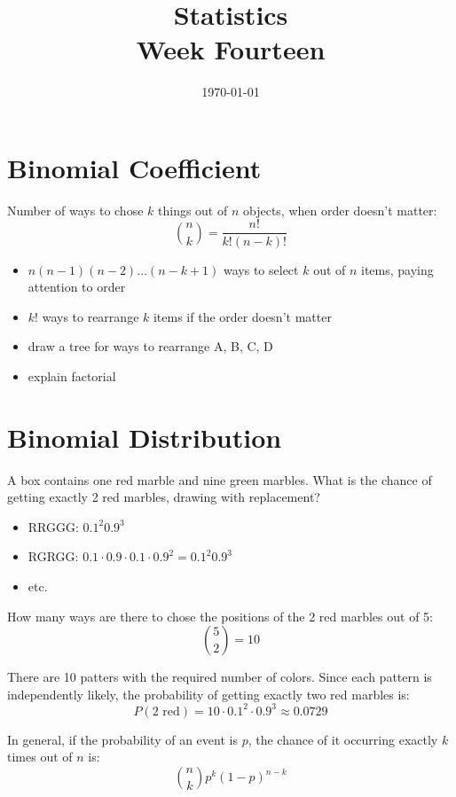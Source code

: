 \documentclass[landscape]{exam}
\title{Statistics \\ Week Fourteen}
\date{\today}
\author{}
\begin{document}
  \maketitle
  \tableofcontents

  \section{Binomial Coefficient}

  Number of ways to chose $k$ things out of $n$ objects, when order doesn't
  matter:
  \[
    \binom{n}{k} = \frac{n!}{k! (n - k)!}
  \]

  \begin{itemize}
    \item $n (n - 1)(n - 2) \dots (n - k + 1)$ ways to select $k$ out of
      $n$ items, paying attention to order

    \item $k!$ ways to rearrange $k$ items if the order doesn't matter

    \item draw a tree for ways to rearrange A, B, C, D

    \item explain factorial
  \end{itemize}

  \section{Binomial Distribution}

  A box contains one red marble and nine green marbles. What is the chance of
  getting exactly 2 red marbles, drawing with replacement?

  \begin{itemize}
    \item RRGGG: $0.1^2 0.9^3$
    \item RGRGG: $0.1 \cdot 0.9 \cdot 0.1 \cdot 0.9^2 = 0.1^2 0.9^3$
    \item etc.
  \end{itemize}

  How many ways are there to chose the positions of the 2 red marbles out of 5:
  \[
    \binom{5}{2} = 10
  \]

  There are 10 patters with the required number of colors. Since each pattern is
  independently likely, the probability of getting exactly two red marbles is:
  \[
    P(\text{2 red}) = 10 \cdot 0.1^2 \cdot 0.9^3 \approx \boxed{ 0.0729 }
  \]

  In general, if the probability of an event is $p$, the chance of it occurring
  exactly $k$ times out of $n$ is:
  \[
    \binom{n}{k} p^k (1 - p)^{n - k}
  \]
\end{document}

